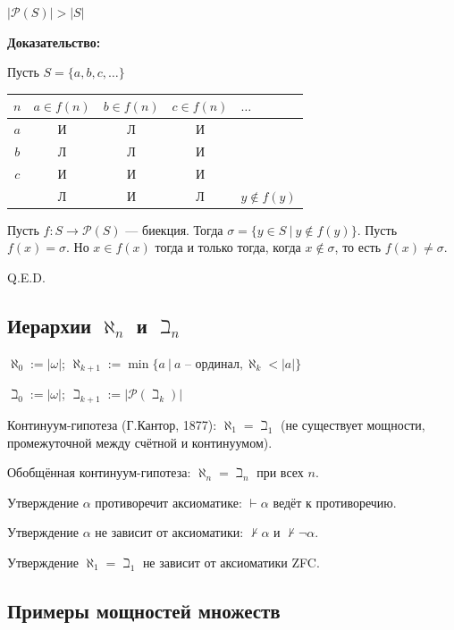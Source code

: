
$|\mathcal{P}(S)| > |S|$

\textbf{Доказательство:}

Пусть $S = \{a,b,c,\dots\}$

\begin{center}
\begin{tabular}{c|cccl}
$n$ & $a \in f(n)$ & $b \in f(n)$ & $c \in f(n)$ & $\dots$ \\\hline
$a$ & \color{red}И & Л & И \\
$b$ &       Л & \color{red}Л& И \\
$c$ &   И & И & \color{red}И\\\hline
   & Л & И & Л & $y \notin f(y)$
\end{tabular}
\end{center}

Пусть $f: S \rightarrow \mathcal{P}(S)$ --- биекция. Тогда $\sigma = \{ y\in S\ |\ y\notin f(y)\}$. Пусть $f(x) = \sigma$.
Но $x \in f(x)$ тогда и только тогда, когда $x \notin \sigma$, то есть $f(x) \ne \sigma$.

\hfill Q.E.D.

   \subsection{Иерархии $\aleph_n$ и $\beth_n$}

    $\aleph_0 := |\omega|$; $\aleph_{k+1} := \min\{ a\ |\ a\text{ -- ординал},\aleph_k < |a|\}$

    $\beth_0 := |\omega|$; $\beth_{k+1} := |\mathcal{P}(\beth_k)|$

   Континуум-гипотеза (Г.Кантор, 1877): $\aleph_1 = \beth_1$ (не существует мощности, промежуточной между счётной и континуумом).

   Обобщённая континуум-гипотеза: $\aleph_n = \beth_n$ при всех $n$.

    Утверждение $\alpha$ противоречит аксиоматике: $\vdash\alpha$ ведёт к противоречию.

    Утверждение $\alpha$ не зависит от аксиоматики: $\not\vdash\alpha$ и $\not\vdash\neg\alpha$.


   Утверждение $\aleph_1 = \beth_1$ не зависит от аксиоматики ZFC.

\subsection{Примеры мощностей множеств}

